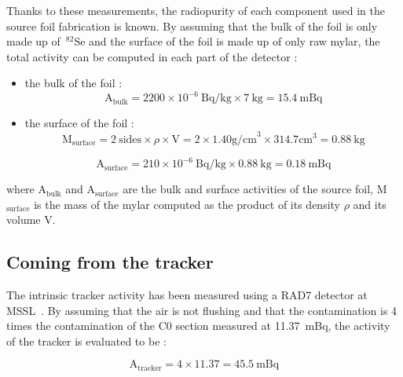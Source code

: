 \documentclass[main.tex]{subfiles}
\begin{document}
\bigskip


\noindent Thanks to these measurements, the radiopurity of each component used in the source foil fabrication is known. By assuming that the bulk of the foil is only made up of~$^{\text{82}}$Se and the surface of the foil is made up of only raw mylar, the total activity can be computed in each part of the detector : 

\begin{itemize}
\item the bulk of the foil :
\begin{equation}
\text{A}_{\text{bulk}} =  \text{2200} \times \text{10}^{-\text{6}}~ \text{Bq/kg} \times \text{7}~\text{kg} = \text{15.4}~\text{mBq} 
\end{equation}

\item the surface of the foil :
\begin{equation}
\text{M}_{\text{surface}} = \text{2}~\text{sides} \times \rho \times \text{V} = \text{2} \times \text{1.40} \text{g/cm}^\text{3} \times \text{314.7} \text{cm}^\text{3} = \text{0.88}~\text{kg}
\end{equation}

\begin{equation}
\text{A}_{\text{surface}} = \text{210} \times \text{10}^{-\text{6}}~\text{Bq/kg} \times \text{0.88}~\text{kg} = \text{0.18}~\text{mBq} 
\end{equation}
\end{itemize}


\NI where A$_{\text{bulk}}$ and A$_{\text{surface}}$ are the bulk and surface activities of the source foil, M$_{\text{surface}}$ is the mass of the mylar computed as the product of its density $\rho$ and its volume V.


\subsection{Coming from the tracker}\label{sec:ActivityTracker}


\noindent The intrinsic tracker activity has been measured using a RAD7 detector at MSSL~\cite{RAD7measurement}. By assuming that the air is not flushing and that the contamination is 4 times the contamination of the C0 section measured at 11.37~mBq, the activity of the tracker is evaluated to be : 


\begin{equation}
\text{A}_{\text{tracker}} =  \text{4} \times  \text{11.37} = \text{45.5}~\text{mBq} 
\end{equation}
\end{document}

